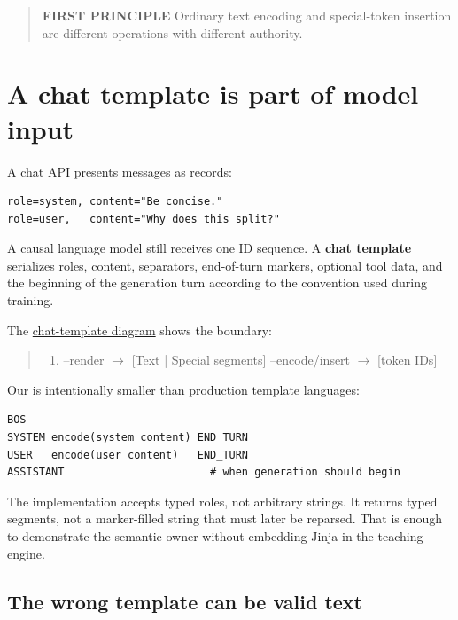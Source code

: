 \begin{quote}
\textbf{FIRST PRINCIPLE} Ordinary text encoding and special-token
insertion are different operations with different authority.
\end{quote}

\section{A chat template is part of model
input}\label{a-chat-template-is-part-of-model-input}

A chat API presents messages as records:

\begin{verbatim}
role=system, content="Be concise."
role=user,   content="Why does this split?"
\end{verbatim}

A causal language model still receives one ID sequence. A \textbf{chat
template} serializes roles, content, separators, end-of-turn markers,
optional tool data, and the beginning of the generation turn according
to the convention used during training.

The
\href{https://github.com/hermonai/inside-the-llm-engine/blob/astra-visual-rewrite/diagrams/tokenizer/chat-template-pipeline.txt}{chat-template
diagram} shows the boundary:

\begin{quote}
\begin{enumerate}
\item [messages] --render \(\longrightarrow\)  [Text | Special segments] --encode/insert \(\longrightarrow\)  [token IDs]
\end{enumerate}
\end{quote}

Our \texttt{} is intentionally smaller than
production template languages:

\begin{verbatim}
BOS
SYSTEM encode(system content) END_TURN
USER   encode(user content)   END_TURN
ASSISTANT                       # when generation should begin
\end{verbatim}

The implementation accepts typed roles, not arbitrary strings. It
returns typed segments, not a marker-filled string that must later be
reparsed. That is enough to demonstrate the semantic owner without
embedding Jinja in the teaching engine.

\subsection{The wrong template can be valid
text}\label{the-wrong-template-can-be-valid-text}

